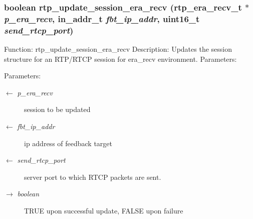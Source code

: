 \subsubsection{\setlength{\rightskip}{0pt plus 5cm}boolean rtp\_\-update\_\-session\_\-era\_\-recv (\bf{rtp\_\-era\_\-recv\_\-t} $\ast$ {\em p\_\-era\_\-recv}, in\_\-addr\_\-t {\em fbt\_\-ip\_\-addr}, uint16\_\-t {\em send\_\-rtcp\_\-port})}\label{rtp__era__recv_8h_a3439cae09397ed5241ddf6c5337f1f8}


Function: rtp\_\-update\_\-session\_\-era\_\-recv Description: Updates the session structure for an RTP/RTCP session for era\_\-recv environment. Parameters: \begin{Desc}
\item[Parameters:]
\begin{description}
\item[\mbox{$\leftarrow$} {\em p\_\-era\_\-recv}]session to be updated \item[\mbox{$\leftarrow$} {\em fbt\_\-ip\_\-addr}]ip address of feedback target \item[\mbox{$\leftarrow$} {\em send\_\-rtcp\_\-port}]server port to which RTCP packets are sent. \item[\mbox{$\rightarrow$} {\em boolean}]TRUE upon successful update, FALSE upon failure \end{description}
\end{Desc}
